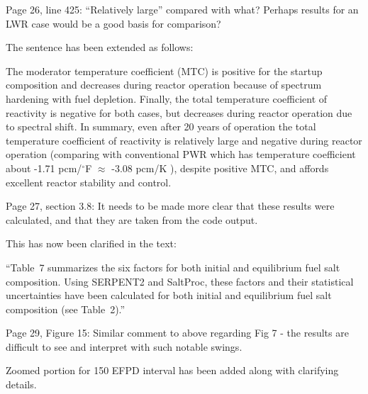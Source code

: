 \documentclass[answers,11pt]{exam}
\begin{document}
\begin{questions}
        \question  Page 26, line 425: ``Relatively large'' compared with what? 
        Perhaps results for an LWR case would be a good basis for comparison?
        \begin{solution}
                The sentence has been extended as follows:
                
                The moderator temperature coefficient (MTC) is positive for the 
                startup composition and decreases during reactor operation 
                because of spectrum hardening with fuel depletion.  Finally, 
                the total temperature coefficient of reactivity is negative for 
                both cases, but decreases during reactor operation due to 
                spectral shift. In summary, even after 20 years of operation 
                the total temperature coefficient of reactivity is relatively 
                large and negative during reactor operation (comparing with 
                conventional PWR which has temperature coefficient about -1.71 
                pcm/$^\circ$F $\approx$ -3.08 pcm/K 
                \cite{forget_integral_2018}), despite positive MTC, and affords 
                excellent reactor stability and control.


        \end{solution}

        \question  Page 27, section 3.8: It needs to be made more clear that 
        these results were calculated, and that they are taken from the code 
        output.
        \begin{solution}
                This has now been clarified in the text:
                
                ``Table~7 summarizes the six factors for both initial and 
                equilibrium fuel salt composition. Using SERPENT2 and SaltProc, 
                these factors and their statistical uncertainties have been 
                calculated for both initial and equilibrium fuel salt 
                composition (see Table~2).''
        \end{solution}

        \question  Page 29, Figure 15: Similar comment to above regarding Fig 7 
        - the results are difficult to see and interpret with such notable 
        swings.
        \begin{solution}
                Zoomed portion for 150 EFPD interval has been added along with 
        clarifying details.
        \end{solution}


\end{questions}
\end{document}

